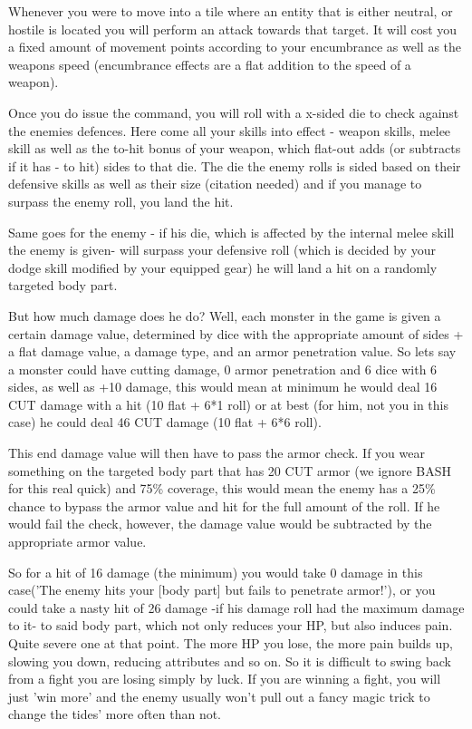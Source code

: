 \documentclass[11pt]{report}
\begin{document}
Whenever you were to move into a tile where an entity that is either neutral, or hostile is located you will perform an attack towards that target. It will cost you a fixed amount of movement points according to your encumbrance as well as the weapons speed (encumbrance effects are a flat addition to the speed of a weapon).

Once you do issue the command, you will roll with a x-sided die to check against the enemies defences. Here come all your skills into effect - weapon skills, melee skill as well as the to-hit bonus of your weapon, which flat-out adds (or subtracts if it has - to hit) sides to that die. The die the enemy rolls is sided based on their defensive skills as well as their size (citation needed) and if you manage to surpass the enemy roll, you land the hit.

Same goes for the enemy - if his die, which is affected by the internal melee skill the enemy is given- will surpass your defensive roll (which is decided by your dodge skill modified by your equipped gear) he will land a hit on a randomly targeted body part.

But how much damage does he do? Well, each monster in the game is given a certain damage value, determined by dice with the appropriate amount of sides + a flat damage value, a damage type, and an armor penetration value. So lets say a monster could have cutting damage, 0 armor penetration and 6 dice with 6 sides, as well as +10 damage, this would mean at minimum he would deal 16 CUT damage with a hit (10 flat + 6*1 roll) or at best (for him, not you in this case) he could deal 46 CUT damage (10 flat + 6*6 roll).

This end damage value will then have to pass the armor check. If you wear something on the targeted body part that has 20 CUT armor (we ignore BASH for this real quick) and 75\% coverage, this would mean the enemy has a 25\% chance to bypass the armor value and hit for the full amount of the roll. If he would fail the check, however, the damage value would be subtracted by the appropriate armor value.

So for a hit of 16 damage (the minimum) you would take 0 damage in this case('The enemy hits your [body part] but fails to penetrate armor!'), or you could take a nasty hit of 26 damage -if his damage roll had the maximum damage to it- to said body part, which not only reduces your HP, but also induces pain. Quite severe one at that point. The more HP you lose, the more pain builds up, slowing you down, reducing attributes and so on. So it is difficult to swing back from a fight you are losing simply by luck. If you are winning a fight, you will just 'win more' and the enemy usually won't pull out a fancy magic trick to change the tides' more often than not.
\end{document}

